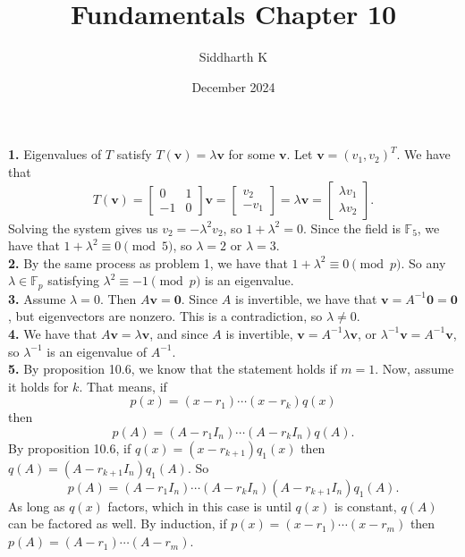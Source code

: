 \documentclass{article}
\title{Fundamentals Chapter 10}
\author{Siddharth K}
\date{December 2024}
\newcommand{\bv}{\mathbf{v}}
\newcommand{\bz}{\mathbf{0}}
\newcommand{\F}{\mathbb{F}}
\begin{document}
\maketitle

\textbf{1.} Eigenvalues of $T$ satisfy $T(\bv) = \lambda \bv$ for some $\bv$. Let $\bv = (v_1, v_2)^T$. We have that
$$T(\bv) = \begin{bmatrix}
    0 & 1 \\
    -1 & 0
\end{bmatrix}\bv = \begin{bmatrix}
    v_2 \\
    -v_1
\end{bmatrix} = \lambda \bv = \begin{bmatrix}
    \lambda v_1 \\
    \lambda v_2
\end{bmatrix}.$$
Solving the system gives us $v_2 = -\lambda^2 v_2$, so $1 + \lambda^2 = 0$. Since the field is $\F_5$, we have that $1 + \lambda^2 \equiv 0 \pmod{5}$, so $\lambda = 2$ or $\lambda = 3$. \\

\textbf{2.} By the same process as problem 1, we have that $1 + \lambda^2 \equiv 0 \pmod{p}$. So any $\lambda \in \F_p$ satisfying $\lambda^2 \equiv -1 \pmod{p}$ is an eigenvalue. \\

\textbf{3.} Assume $\lambda = 0$. Then $A\bv = \bz$. Since $A$ is invertible, we have that $\bv = A^{-1}\bz = \bz$, but eigenvectors are nonzero. This is a contradiction, so $\lambda \neq 0$. \\

\textbf{4.} We have that $A\bv = \lambda \bv$, and since $A$ is invertible, $\bv = A^{-1}\lambda \bv$, or $\lambda^{-1}\bv = A^{-1}\bv$, so $\lambda^{-1}$ is an eigenvalue of $A^{-1}$. \\

\textbf{5.} By proposition 10.6, we know that the statement holds if $m = 1$. Now, assume it holds for $k$. That means, if
$$p(x) = (x - r_1)\cdots(x - r_k)q(x)$$
then
$$p(A) = (A - r_1I_n)\cdots(A - r_kI_n)q(A).$$
By proposition 10.6, if $q(x) = (x - r_{k + 1})q_1(x)$ then $q(A) = (A - r_{k + 1}I_n)q_1(A)$. So
$$p(A) = (A - r_1I_n)\cdots(A - r_kI_n)(A - r_{k + 1}I_n)q_1(A).$$
As long as $q(x)$ factors, which in this case is until $q(x)$ is constant, $q(A)$ can be factored as well. By induction, if $p(x) = (x - r_1)\cdots(x - r_m)$ then $p(A) = (A - r_1)\cdots(A - r_m)$. \\
\end{document}
